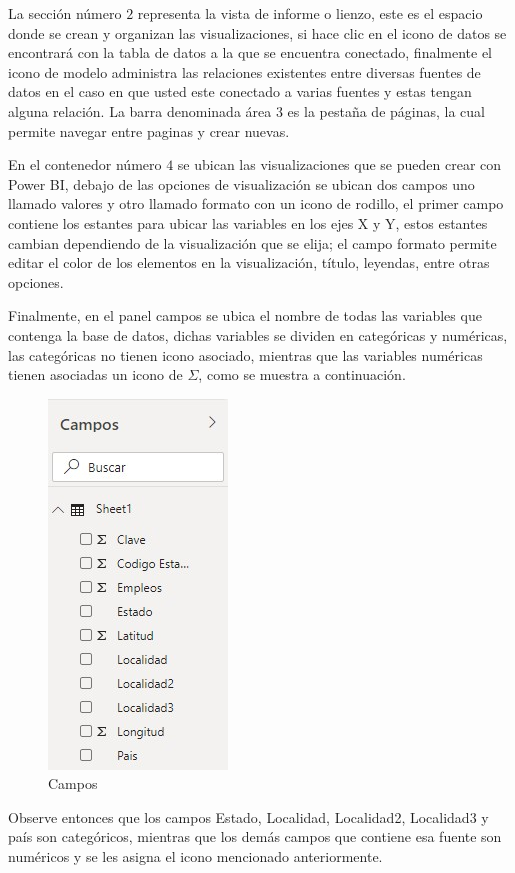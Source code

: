\documentclass[
]{book}
\begin{document}
La sección número \(2\) representa la vista de informe o lienzo, este es el espacio donde se crean y organizan las visualizaciones, si hace clic en el icono de datos se encontrará con la tabla de datos a la que se encuentra conectado, finalmente el icono de modelo administra las relaciones existentes entre diversas fuentes de datos en el caso en que usted este conectado a varias fuentes y estas tengan alguna relación. La barra denominada área \(3\) es la pestaña de páginas, la cual permite navegar entre paginas y crear nuevas.

En el contenedor número \(4\) se ubican las visualizaciones que se pueden crear con Power BI, debajo de las opciones de visualización se ubican dos campos uno llamado valores y otro llamado formato con un icono de rodillo, el primer campo contiene los estantes para ubicar las variables en los ejes X y Y, estos estantes cambian dependiendo de la visualización que se elija; el campo formato permite editar el color de los elementos en la visualización, título, leyendas, entre otras opciones.

Finalmente, en el panel campos se ubica el nombre de todas las variables que contenga la base de datos, dichas variables se dividen en categóricas y numéricas, las categóricas no tienen icono asociado, mientras que las variables numéricas tienen asociadas un icono de \(\Sigma\), como se muestra a continuación.

\begin{figure}

{\centering \includegraphics[width=0.2\linewidth]{Imágenes/powerbi7} 

}

\caption{Campos}\label{fig:campospowerbi-fig}
\end{figure}

Observe entonces que los campos Estado, Localidad, Localidad2, Localidad3 y país son categóricos, mientras que los demás campos que contiene esa fuente son numéricos y se les asigna el icono mencionado anteriormente.
\end{document}
